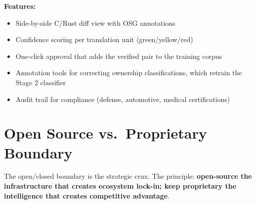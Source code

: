 \documentclass[11pt,a4paper]{article}
\theoremstyle{definition}
\theoremstyle{remark}
\begin{document}
\textbf{Features:}
\begin{itemize}[leftmargin=2em]
\item Side-by-side C/Rust diff view with OSG annotations
\item Confidence scoring per translation unit (green/yellow/red)
\item One-click approval that adds the verified pair to the training corpus
\item Annotation tools for correcting ownership classifications, which retrain the Stage 2 classifier
\item Audit trail for compliance (defense, automotive, medical certifications)
\end{itemize}


\section{Open Source vs.\ Proprietary Boundary}

The open/closed boundary is the strategic crux. The principle: \textbf{open-source the infrastructure that creates ecosystem lock-in; keep proprietary the intelligence that creates competitive advantage}.
\end{document}
